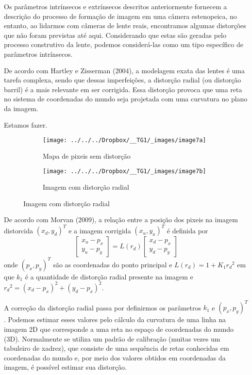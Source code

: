 \documentclass[ecp,tc]{iiufrgs}
\begin{document}
Os parâmetros intrínsecos e extrínsecos descritos anteriormente fornecem a descrição do processo de formação de imagem em uma câmera estenopeica, no entanto, ao lidarmos com câmeras de lente reais, encontramos algumas distorções que não foram previstas
até aqui. Considerando que estas são geradas pelo processo construtivo da lente, podemos considerá-las como um tipo específico de parâmetros intrínsecos.

De acordo com Hartley e Zisserman (2004), a modelagem exata das lentes é uma tarefa complexa, sendo que dessas imperfeições, a distorção radial (ou distorção barril) é a mais relevante em ser corrigida. Essa distorção provoca que uma reta no sistema de coordenadas do mundo seja projetada com uma curvatura no plano da imagem.

Estamos fazer.


\begin{figure}
	\centering
	\caption{Distorção radial}
	\begin{subfigure}[b]{0.4\textwidth}
		\texttt{[image: ../../../Dropbox/\_\_TG1/\_images/image7a]}
		\caption{Mapa de pixeis sem distorção}
		\label{fig:image7a}
	\end{subfigure}
	\quad
	\begin{subfigure}[b]{0.4\textwidth}
		\texttt{[image: ../../../Dropbox/\_\_TG1/\_images/image7b]}
		\caption{Imagem com distorção radial}
		\label{fig:image7b}
	\end{subfigure}
	\label{fig:image7}
\end{figure}

De acordo com Morvan (2009), a relação entre a posição dos pixeis na imagem distorcida $ (x_d, y_d)^T $ e a imagem corrigida $ (x_u, y_u)^T $ é definida por
\[ \begin{bmatrix}x_u - p_x \\ y_u - p_y \end{bmatrix} = L(r_d)\begin{bmatrix}x_d - p_x \\ y_d - p_y \end{bmatrix}\]
onde $ (p_x, p_y)^T $ são as coordenadas do ponto principal e $ L(r_d) = 1+K_1{r_d}^2 $ em que $ k_1 $ é a quantidade de distorção radial presente na imagem e $ {r_d}^2 = (x_d - p_x)^2 + (y_d - p_x)^2 $.

A correção da distorção radial passa por definirmos os parâmetros $ k_1 $ e $ (p_x, p_y)^T $. Podemos estimar esses valores pelo cálculo da curvatura de uma linha na imagem 2D que corresponde a uma reta no espaço de coordenadas do mundo (3D). Normalmente se utiliza um padrão de calibração (muitas vezes um tabuleiro de xadrez), que consiste de uma sequência de retas conhecidas em coordenadas do mundo e, por meio dos valores obtidos em coordenadas da imagem, é possível estimar sua distorção.
\end{document}
